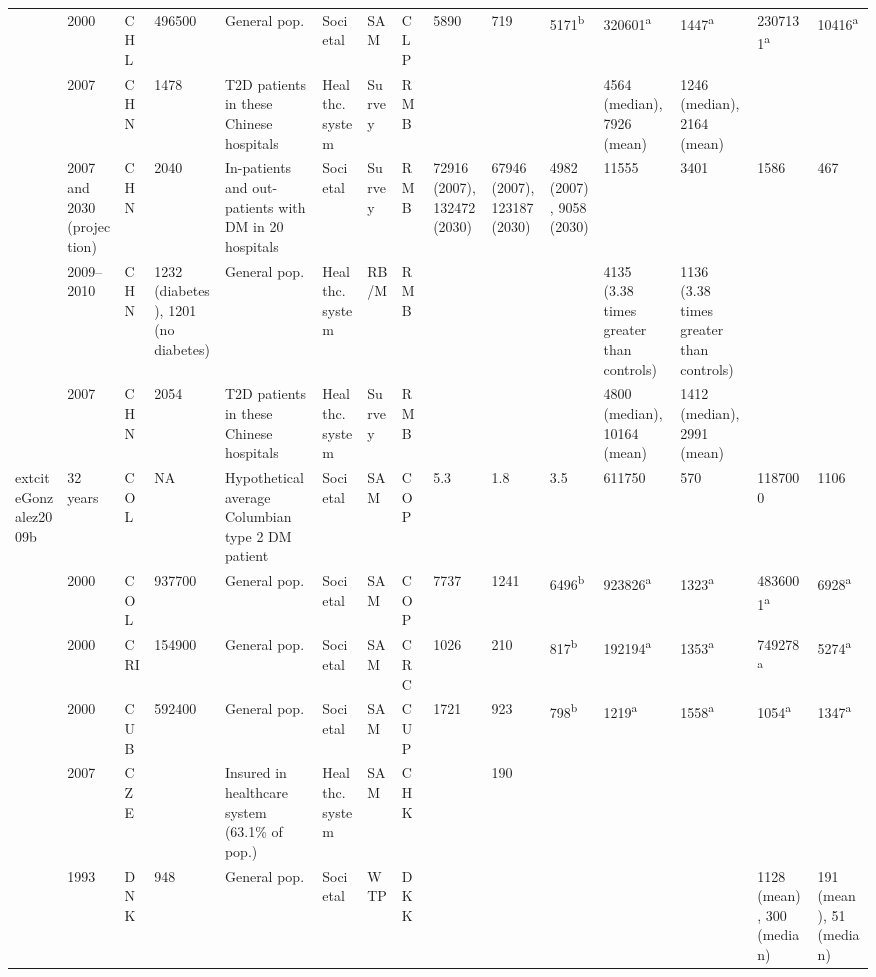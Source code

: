 {\begin{landscape}
\begin{tabularx}{\linewidth}{Z X X Z Z X X X X X X X X Y Y}
\textcite{Barcelo2003} & 2000 & CHL & 496500 & General pop. & Societal & SAM & CLP & 5890 & 719 & 5171\textsuperscript{b} & 320601\textsuperscript{a} & 1447\textsuperscript{a} & 2307131\textsuperscript{a} & 10416\textsuperscript{a} \\
\textcite{Wang2010c} & 2007 & CHN & 1478 & T2D patients in these Chinese hospitals & Healthc. system & Survey & RMB &  &  &  & 4564 (median), 7926 (mean) & 1246 (median), 2164 (mean) &  &  \\
\textcite{Wang2009f} & 2007 and 2030 (projection) & CHN & 2040 & In-patients and out-patients with DM in 20   hospitals & Societal & Survey & RMB & 72916 (2007), 132472 (2030) & 67946 (2007), 123187 (2030) & 4982 (2007), 9058 (2030) & 11555 & 3401 & 1586 & 467 \\
\textcite{Yang2012} & 2009--2010 & CHN & 1232 (diabetes), 1201 (no diabetes) & General pop. & Healthc. system & RB/M & RMB &  &  &  & 4135 (3.38 times greater than controls) & 1136 (3.38 times greater than controls) &  &  \\
\textcite{Wang2009b} & 2007 & CHN & 2054 & T2D patients in these Chinese hospitals & Healthc. system & Survey & RMB &  &  &  & 4800 (median), 10164 (mean) & 1412 (median), 2991 (mean) &  &  \\
	extcite{Gonzalez2009b} & 32 years & COL & NA & Hypothetical average Columbian type 2 DM   patient & Societal & SAM & COP & 5.3 & 1.8 & 3.5 & 611750 & 570 & 1187000 & 1106 \\
\textcite{Barcelo2003} & 2000 & COL & 937700 & General pop. & Societal & SAM & COP & 7737 & 1241 & 6496\textsuperscript{b} & 923826\textsuperscript{a} & 1323\textsuperscript{a} & 4836001\textsuperscript{a} & 6928\textsuperscript{a} \\
\textcite{Barcelo2003} & 2000 & CRI & 154900 & General pop. & Societal & SAM & CRC & 1026 & 210 & 817\textsuperscript{b} & 192194\textsuperscript{a} & 1353\textsuperscript{a} & 749278\textsuperscript{a} & 5274\textsuperscript{a} \\
\textcite{Barcelo2003} & 2000 & CUB & 592400 & General pop. & Societal & SAM & CUP & 1721 & 923 & 798\textsuperscript{b} & 1219\textsuperscript{a} & 1558\textsuperscript{a} & 1054\textsuperscript{a} & 1347\textsuperscript{a} \\
\textcite{Horak2009} & 2007 & CZE &  & Insured in healthcare system (63.1\% of   pop.) & Healthc. system & SAM & CHK &  & 190 &  &  &  &  &  \\
\textcite{Gyldmark2001} & 1993 & DNK & 948 & General pop. & Societal & \ac{WTP} & DKK &  &  &  &  &  & 1128 (mean), 300 (median) & 191 (mean), 51 (median) \\

\end{tabularx}
\end{landscape}}
